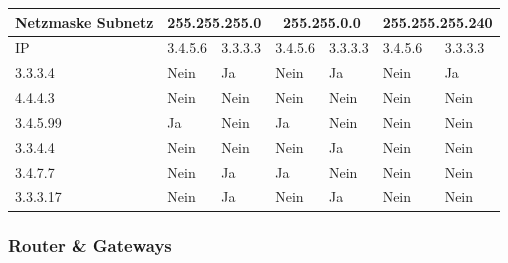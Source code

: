 \begin{myexercise}
\begin{center}
	\end{center}
	\begin{myanswer}
		\begin{table}[H]
			\centering
			\small
			\begin{tabular}{m{2cm}||m{1.5cm}|m{1.5cm}|m{1.5cm}|m{1.5cm}|m{1.5cm}|m{1.7cm}}
				\textbf{Netzmaske Subnetz} & \multicolumn{2}{c|}{255.255.255.0} & \multicolumn{2}{c|}{255.255.0.0} & \multicolumn{2}{c}{255.255.255.240}                               \\
				\midrule
				IP                         & 3.4.5.6                            & 3.3.3.3                          & 3.4.5.6                             & 3.3.3.3 & 3.4.5.6 & 3.3.3.3 \\
				\midrule\midrule
				3.3.3.4                    & Nein                               & Ja                               & Nein                                & Ja      & Nein    & Ja      \\\midrule
				4.4.4.3                    & Nein                               & Nein                             & Nein                                & Nein    & Nein    & Nein    \\\midrule
				3.4.5.99                   & Ja                                 & Nein                             & Ja                                  & Nein    & Nein    & Nein    \\\midrule
				3.3.4.4                    & Nein                               & Nein                             & Nein                                & Ja      & Nein    & Nein    \\\midrule
				3.4.7.7                    & Nein                               & Ja                               & Ja                                  & Nein    & Nein    & Nein    \\\midrule
				3.3.3.17                   & Nein                               & Ja                               & Nein                                & Ja      & Nein    & Nein    \\
			\end{tabular}
		\end{table}
	\end{myanswer}
\end{myexercise}

\subsubsection{Router \& Gateways}

